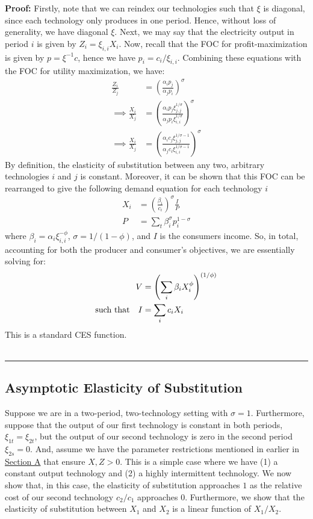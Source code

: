 \documentclass[11pt,a4paper,leqno]{extarticle}
\newenvironment{proof}[1][Proof]{\noindent\textbf{#1:} }{\ \rule{0.5em}{0.5em}}
\begin{document}
	\begin{proof}
		Firstly, note that we can reindex our technologies such that $\xi$ is diagonal, since each technology only produces in one period. Hence, without loss of generality, we have diagonal $\xi$. Next, we may say that the electricity output in period $i$ is given by $Z_i = \xi_{i,i} X_i$. Now, recall that the FOC for profit-maximization is given by $p = \xi^{-1} c$, hence we have $p_i = c_i / \xi_{i,i}$.  Combining these equations with the FOC for utility maximization, we have:
		\begin{align*}
		\frac{Z_i}{Z_j} &= \left( \frac{\alpha_i p_j}{\alpha_j p_i} \right)^\sigma \\
		\implies \frac{ X_i }{X_j} &= \left( \frac{ \alpha_i p_j \xi_{j,j}^{1/\sigma} }{ \alpha_j p_i \xi_{i,i}^{1/\sigma} } \right)^\sigma \\
		\implies \frac{ X_i }{X_j} &= \left( \frac{ \alpha_i c_j \xi_{j,j}^{1/\sigma - 1} }{ \alpha_j c_i \xi_{i,i}^{1/\sigma - 1} } \right)^\sigma
		\end{align*}
		By definition, the elasticity of substitution between any two, arbitrary technologies $i$ and $j$ is constant. Moreover, it can be shown that this FOC can be rearranged to give the following demand equation for each technology $i$
		\begin{align}
		X_i &= \left(\frac{\beta_i}{c_i} \right)^\sigma \frac{I}{P} \\
		P &= \sum_t \beta_i^\sigma p_i^{1-\sigma}
		\end{align}
		where $\beta_i = \alpha_i \xi_{i,i}^{-\phi}$, $\sigma = 1 / (1-\phi)$, and $I$ is the consumers income.	So, in total, accounting for both the producer and consumer's objectives, we are essentially solving for: 
		\begin{align*} 
		V &= \left( \sum_i \beta_i X_i^\phi \right)^{(1/\phi)}  \\
		\text{such that\quad} I &= \sum_i c_i X_i 
		\end{align*}
		This is a standard CES function.
		\\ \hfill
	\end{proof}
	
	\subsection{Asymptotic Elasticity of Substitution}
	
	\label{sec:asympeos}
	
	Suppose we are in a two-period, two-technology setting with $\sigma = 1$. Furthermore, suppose that the output of our first technology is constant in both periods, $\xi_{1t} = \xi_{2t}$, but the output of our second technology is zero in the second period $\xi_{2s} = 0$. And, assume we have the parameter restrictions mentioned in earlier in \hyperref[sec:cobbdoug]{Section A} that ensure $X, Z > 0$. This is a simple case where we have (1) a constant output technology and (2) a highly intermittent technology. We now show that, in this case, the elasticity of substitution approaches $1$ as the relative cost of our second technology $c_2/c_1$ approaches $0$. Furthermore, we show that the elasticity of substitution between $X_1$ and $X_2$ is a linear function of $X_1/X_2$.  
	
\end{document}
